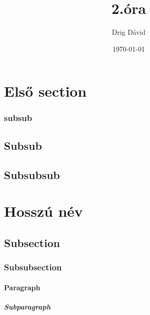 \documentclass{article}
\begin{document}
\title{2.óra}
\author{Drig Dávid}
\date{\today}
\maketitle

\setcounter{secnumdepth}{5}

\section{Első section}

\subsubsection{subsub}

\subsection{Subsub}
\hulipsum
\subsection{Subsubsub}
\hulipsum

\section[Rövid név]{Hosszú név}
\subsection{Subsection}
\subsubsection{Subsubsection}
\paragraph{Paragraph}
\subparagraph{Subparagraph}
\end{document}

